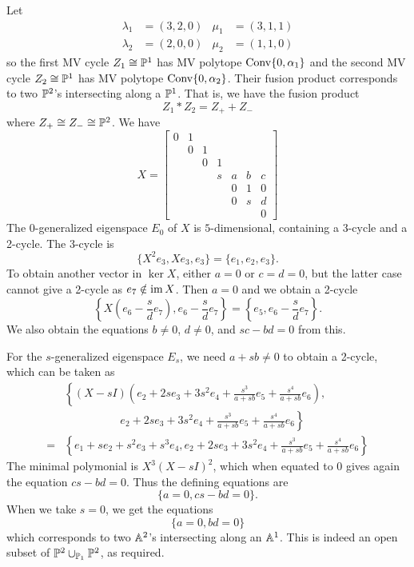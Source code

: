 \begin{example}
    Let
    \[
    \begin{aligned}
        \lambda_1 &= (3,2,0) & \mu_1 &= (3,1,1) \\
        \lambda_2 &= (2,0,0) & \mu_2 &= (1,1,0)
    \end{aligned}
    \]
    so the first MV cycle $Z_1 \cong \PP^1$ has MV polytope $\Conv\{0, \alpha_1\}$ and the second MV cycle $Z_2 \cong \PP^1$ has MV polytope $\Conv\{0, \alpha_2\}$. Their fusion product corresponds to two $\PP^2$'s intersecting along a $\PP^1$. That is, we have the fusion product
    \[
    Z_1 * Z_2 = Z_+ + Z_-
    \]
    where $Z_+ \cong Z_- \cong \PP^2$.
    We have 
    \[
    X = \begin{bmatrix}
    0 & 1 \\
      & 0 & 1 \\
      &   & 0 & 1 \\
      &   &   & s & a & b & c \\
      &   &   &   & 0 & 1 & 0 \\
      &   &   &   & 0 & s & d \\
      &   &   &   &   &   & 0
    \end{bmatrix}
    \]
    The $0$-generalized eigenspace $E_0$ of $X$ is $5$-dimensional, containing a 3-cycle and a 2-cycle.
    The 3-cycle is 
    \[
    \{X^2 e_3 , X e_3, e_3\} = \{e_1, e_2, e_3\}.
    \]
    To obtain another vector in $\ker X$, either $a = 0$ or $c = d = 0$, but the latter case cannot give a 2-cycle as $e_7 \notin \im X$. Then $a = 0$ and we obtain a 2-cycle
    \[
    \left\{X \left( e_6 -\frac{s}{d}e_7 \right), e_6 - \frac{s}{d}e_7 \right\}
    = \left\{e_5, e_6 - \frac{s}{d}e_7 \right\}.
    \]
    We also obtain the equations $b \neq 0$, $d \neq 0$, and $sc - bd = 0$ from this.
    
    For the $s$-generalized eigenspace $E_s$, we need $a + sb \neq 0$ to obtain a 2-cycle, which can be taken as 
    \[
    \begin{split}
    & \left\{ 
    (X -sI) \left( e_2 + 2s e_3 + 3s^2 e_4 + \frac{s^3}{a+sb} e_5 + \frac{s^4}{a+sb} e_6 \right), \right. \\ 
    & \quad \qquad \qquad  \left. e_2 + 2s e_3 + 3s^2 e_4 + \frac{s^3}{a+sb} e_5 + \frac{s^4}{a+sb} e_6 
    \right\} \\
    = & \left\{ 
    e_1 + s e_2 + s^2 e_3 + s^3 e_4, 
    e_2 + 2s e_3 + 3s^2 e_4 + \frac{s^3}{a+sb} e_5 + \frac{s^4}{a+sb} e_6
    \right\}
    \end{split}
    \]
    The minimal polymonial is $X^3 (X-sI)^2$, which when equated to 0 gives again the equation $cs-bd = 0$.
    Thus the defining equations are 
    \[
    \{ a = 0, cs-bd = 0\}.
    \]
    When we take $s = 0$, we get the equations
    \[
    \{a = 0, bd = 0\}
    \]
    which corresponds to two $\AA^2$'s intersecting along an $\AA^1$. This is indeed an open subset of $\PP^2 \cup_{\PP_1} \PP^2$, as required.
\end{example}

